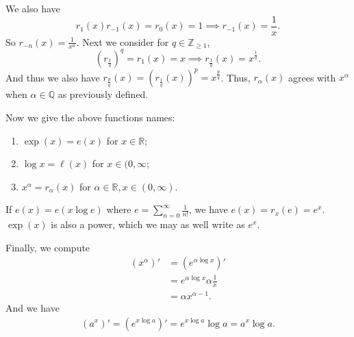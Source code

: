 We also have
\[
    r_1(x)r_{-1}(x) = r_0(x) = 1 \implies r_{-1}(x) = \frac{1}{x}.
\]
So \(r_{-n}(x) = \frac{1}{x^n}\). Next we consider for \(q \in \mathbb{Z}_{\geq 1}\),
\[
    (r_{\frac{1}{q}})^q = r_1(x) = x \implies r_{\frac{1}{q}}(x) = x^{\frac{1}{q}}.
\]
And thus we also have \(r_{\frac{p}{q}}(x) = (r_{\frac{1}{q}}(x))^p = x^{\frac{p}{q}}\). Thus, \(r_\alpha(x)\) agrees with \(x^\alpha\) when \(\alpha\in \mathbb{Q}\) as previously defined.

Now we give the above functions names:
\begin{enumerate}
    \item \(\exp(x) = e(x)\) for \(x \in \mathbb{R}\);
    \item \(\log x = \ell(x)\) for \(x \in (0, \infty \);
    \item \(x^\alpha = r_\alpha(x)\) for \(\alpha \in \mathbb{R}, x \in (0, \infty)\).
\end{enumerate}
If \(e(x) = e(x \log e)\) where \(e = \sum\limits_{n=0}^{\infty} \frac{1}{n!}\), we have \(e(x) = r_x(e) = e^x\). \(\exp(x)\) is also a power, which we may as well write as \(e^x\).

Finally, we compute
\begin{align*}
    (x^\alpha)' &= (e^{\alpha \log x})'\\
    &= e^{\alpha \log x}\alpha\frac{1}{x}\\
    &= \alpha x^{\alpha - 1}.
\end{align*}
And we have
\begin{align*}
    (a^x)' = (e^{x \log a})' = e^{x \log a} \log a = a^x \log a.
\end{align*}